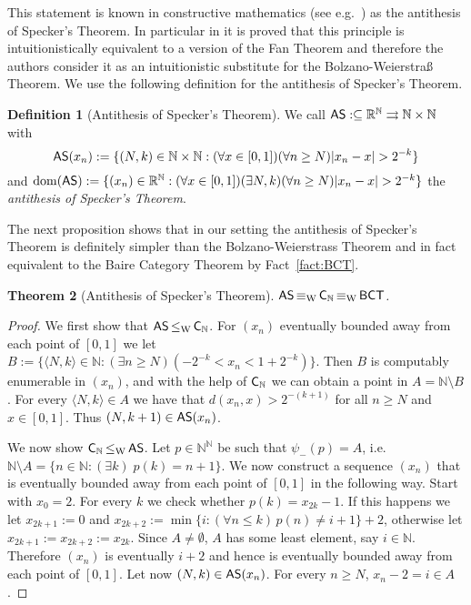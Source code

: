 \documentclass[a4paper]{amsart}
\def\IN{{\mathbb{N}}}
\def\IR{{\mathbb{R}}}
\def\In{\subseteq}
\def\mto{\rightrightarrows}
\def\dom{{\rm dom}}
\def\Baire{{\IN^\IN}}
\def\BCT{\text{\rm\sffamily BCT}}
\def\C{\mbox{\rm\sffamily C}}
\def\CN{\text{\rm\sffamily C$_{\IN}$}}
\def\leqW{\mathop{\leq_{\mathrm{W}}}}
\def\equivW{\mathop{\equiv_{\mathrm{W}}}}
\newcommand{\fa}{\forall}
\newcommand{\ex}{\exists}
\newcommand{\eps}{\emptyset}
\newcommand{\bbN}{\mathbb{N}}
\newcommand{\bbR}{\mathbb{R}}
\newcommand{\AS}{\text{\rm\sffamily AS}}
\newtheorem{theorem}{Theorem}[section]
\theoremstyle{definition}
\newtheorem{definition}[theorem]{Definition}
\begin{document}
This statement is known in constructive mathematics (see e.g.\
\cite{BB07,Bri09}) as the antithesis of Specker's Theorem. In
particular in \cite{BB07} it is proved that this principle is
intuitionistically equivalent to a version of the Fan Theorem and therefore the
authors consider it as an intuitionistic substitute for the Bolzano-Weierstra\ss{} Theorem.
We use the following definition for the antithesis of Specker's Theorem.

\begin{definition}[Antithesis of Specker's Theorem]
We call $\AS:\In\IR^\IN\mto\IN\times\IN$ with
\[\AS(x_n) := \{(N,k)\in \IN\times \IN:(\fa x\in[0,1])(\fa n\geq N)|x_n-x|>2^{-k}\}\]
and 
$\dom(\AS):=\{(x_n) \in \bbR^\bbN:(\fa x\in [0,1])(\ex N, k)(\fa n\geq N)|x_n-x|>2^{-k}\}$
the {\em antithesis of Specker's Theorem}.
\end{definition}

The next proposition shows that in our setting the antithesis
of Specker's Theorem is definitely simpler than the
Bolzano-Weierstrass Theorem and in fact equivalent to the Baire Category Theorem
by Fact~\ref{fact:BCT}.

\begin{theorem}[Antithesis of Specker's Theorem]
\label{thm:AS}
$\AS \equivW \CN\equivW\BCT$.
\end{theorem}
\begin{proof}
We first show that $\AS \leqW \CN$. For $(x_n)$ eventually bounded
away from each point of $[0,1]$ we let
$B := \{\langle N,k\rangle\in \bbN:(\ex n \geq N)(-2^{-k} < x_n < 1+ 2^{-k})\}$.
Then $B$ is computably enumerable in $(x_n)$, and with the help of $\C_\IN$
we can obtain a point in $A = \IN\setminus B$.
For every $\langle N,k \rangle\in A$ we
have that $d(x_n, x)>2^{-(k+1)}$ for all $n \geq N$ and $x \in[0,1]$.
Thus $(N, k+1) \in \AS(x_n)$.

We now show $\CN \leqW \AS$. 
Let $p\in\Baire$ be such that $\psi_-(p)=A$, i.e.\ $\IN\setminus A=\{n\in\IN:(\exists k)\;p(k)=n+1\}$.
We now construct a
sequence $(x_n)$ that is eventually bounded away from each point of $[0,1]$ in
the following way. Start with $x_0=2$. For every $k$ we check whether
$p(k)=x_{2k}-1$. If this happens we let $x_{2k+1}:=0$ and $x_{2k+2} :=
\min\{i:(\forall n \leq k)\, p(n) \neq i+1\} +2$, otherwise let
$x_{2k+1} := x_{2k+2} := x_{2k}$.
Since $A \neq \eps$, $A$ has some least element, say $i\in \bbN$.
Therefore $(x_n)$ is eventually $i+2$ and hence is eventually bounded
away from each point of $[0,1]$. Let now $(N,k) \in \AS(x_n)$. For
every $n \geq N$, $x_n - 2 = i \in A$.
\end{proof}
\end{document}
